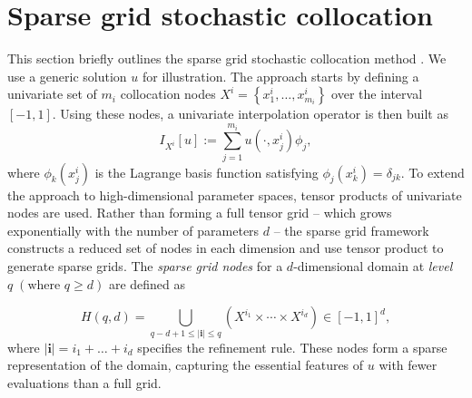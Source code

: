 \section{Sparse grid stochastic collocation}\label{sec:SC}
This section briefly outlines the sparse grid stochastic collocation method \cite{BaNoRi:2000, KlBa:2005, MaNi:2009, Sm:1963}. We use a generic solution $u$ for illustration. The approach starts by defining a univariate set of $m_i$ collocation nodes $X^i = \left\{x_1^i,\ldots, x_{m_i}^i\right\}$ over the interval $[-1,1]$. Using these nodes, a univariate interpolation operator is then built as 
%
\[
I_{X^{i}}[u]:=\sum_{j=1}^{m_{i}} u(\cdot, x_j^i)\phi_j,
\]
%
where $\phi_k(x_j^i)$ is the Lagrange basis function satisfying $\phi_j(x_k^i) = \delta_{jk}$. To extend the approach to high-dimensional parameter spaces, tensor products of univariate nodes are used. Rather than forming a full tensor grid -- which grows exponentially with the number of parameters $d$ -- the sparse grid framework constructs a reduced set of nodes in each dimension and use tensor product to generate sparse grids. The {\it sparse grid nodes} for a $d$-dimensional domain at {\it level} $q\; (\text{where }q\ge d)$ are defined as


%
\begin{equation*}
H(q,d) = \bigcup_{q-d+1\le|\boldsymbol{i}|\le q} \left(X^{i_1}\times \cdots\times X^{i_d}\right)\in [-1,1]^d, 
\end{equation*}
where $|\boldsymbol{i}| = i_1+\ldots+i_d$ specifies the refinement rule. These nodes form a sparse representation of the domain, capturing the essential features of $u$ with fewer evaluations than a full grid. 


